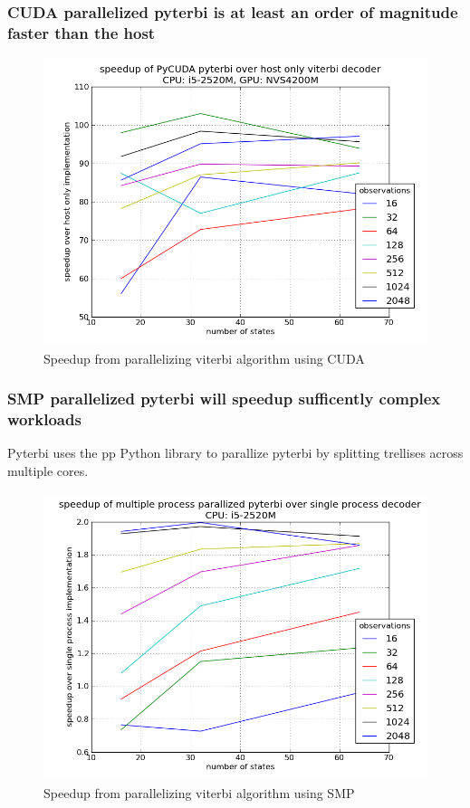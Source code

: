 \documentclass{beamer}
\begin{document}
     
    \begin{frame}
        \frametitle{CUDA parallelized pyterbi is at least an order of magnitude faster than the host}
        \begin{figure}
            \includegraphics[width=.8\textwidth]{figures/speedupgraphcuda.png}
            \caption{Speedup from parallelizing viterbi algorithm using CUDA}
        \end{figure}

    \end{frame}
    


    \begin{frame}
        \frametitle{SMP parallelized pyterbi will speedup sufficently complex workloads}
        Pyterbi uses the pp Python library to parallize pyterbi by splitting trellises across multiple cores. 
        \begin{figure}
            \includegraphics[width=.8\textwidth]{figures/speedupgraphhost.png}
            \caption{Speedup from parallelizing viterbi algorithm using SMP}
        \end{figure}

    \end{frame}
    
\end{document}
